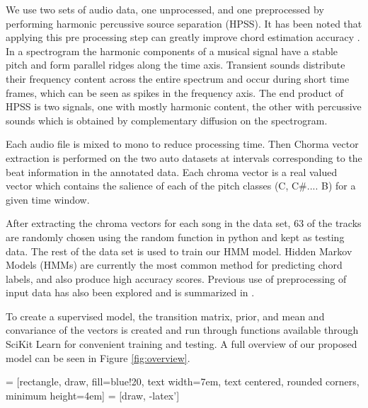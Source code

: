 \documentclass{article}
\begin{document}
We use two sets of audio data, one unprocessed, and one preprocessed by
performing harmonic percussive source separation (HPSS). It has been noted that 
applying this pre processing step can greatly improve chord estimation accuracy \cite{Reed:09}. 
In a spectrogram the harmonic components of a musical signal have 
a stable pitch and form parallel ridges along the time axis. Transient sounds distribute 
their frequency content across the entire spectrum and occur during short time frames, 
which can be seen as spikes in the frequency axis. The end product of HPSS is two signals, 
one with mostly harmonic content, the other with percussive sounds which is obtained by 
complementary diffusion on the spectrogram.

Each audio file is mixed to mono to reduce processing time. Then Chorma vector extraction is 
performed on the two auto datasets at intervals corresponding to the beat information in the 
annotated data. Each chroma vector is a real valued vector which contains the salience of each 
of the pitch classes (C, C\#.... B) for a given time window.

After extracting the chroma vectors for each song in the data set, 63 of the tracks are randomly
chosen using the random function in python and kept as testing data. The rest of the data set
is used to train our HMM model. Hidden Markov Models (HMMs) are currently the most common method for 
predicting chord labels, and also produce high accuracy scores. Previous use of
preprocessing of input data has also been explored and is summarized in \cite{McVicar:00}.

To create a supervised model, the transition matrix, prior, and mean and convariance of the 
vectors is created and run through functions available through
SciKit Learn for convenient training and testing. A full overview of our
proposed model can be seen in Figure \ref{fig:overview}.

 = [rectangle, draw, fill=blue!20,
    text width=7em, text centered, rounded corners, minimum height=4em]
 = [draw, -latex']
\end{document}
